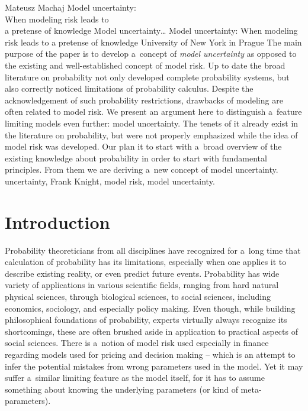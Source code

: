 \begin{artengenv}{Mateusz Machaj}
	{Model uncertainty:\\When modeling risk leads to\\a pretense of knowledge}
	{Model uncertainty\ldots}
	{Model uncertainty: When modeling risk leads to a pretense of knowledge}
	{University of New York in Prague}
	{The main purpose of the paper is to develop a~concept of \textit{model uncertainty} as opposed to the existing and well-established concept of model risk. Up to date the broad literature on probability not only developed complete probability systems, but also correctly noticed limitations of probability calculus. Despite the acknowledgement of such probability restrictions, drawbacks of modeling are often related to model risk. We present an argument here to distinguish a~feature limiting models even further: model uncertainty. The tenets of it already exist in the literature on probability, but were not properly emphasized while the idea of model risk was developed. Our plan it to start with a~broad overview of the existing knowledge about probability in order to start with fundamental principles. From them we are deriving a~new concept of model uncertainty.
	}
	{uncertainty, Frank Knight, model risk, model uncertainty.}





\section{Introduction}

\lettrine[loversize=0.13,lines=2,lraise=-0.03,nindent=0em,findent=0.2pt]%
{P}{}robability theoreticians from all disciplines have recognized for a~long time that calculation of probability has its limitations, especially when one applies it to describe existing reality, or even predict future events. Probability has wide variety of applications in various scientific fields, ranging from hard natural physical sciences, through biological sciences, to social sciences, including economics, sociology, and especially policy making. Even though, while building philosophical foundations of probability, experts virtually always recognize its shortcomings, these are often brushed aside in application to practical aspects of social sciences. There is a~notion of model risk used especially in finance regarding models used for pricing and decision making -- which is an attempt to infer the potential mistakes from wrong parameters used in the model. Yet it may suffer a~similar limiting feature as the model itself, for it has to assume something about knowing the underlying parameters (or kind of meta-parameters).




\end{artengenv}
